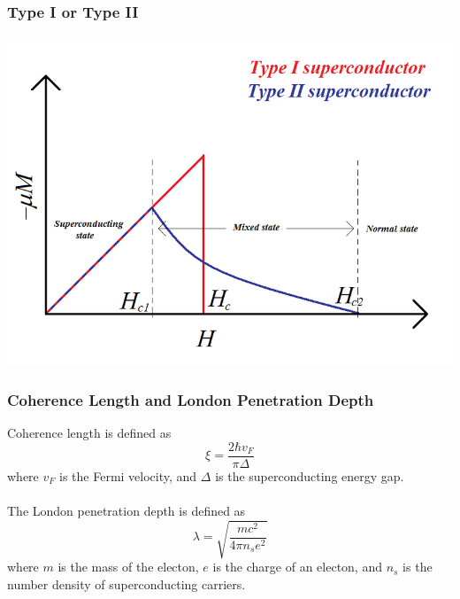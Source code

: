 \documentclass[10pt]{beamer}
\theoremstyle{definition}
\begin{document}
\begin{frame}
    \frametitle{Type I or Type II}

    \begin{center}
    \includegraphics[scale = 0.3]{Magnetisation_and_superconductors}
    \end{center}

\end{frame}


\begin{frame}
    \frametitle{Coherence Length and London Penetration Depth}

    Coherence length is defined as
    \begin{equation}
        \xi = \frac{2 \hbar v_F}{\pi \Delta}
    \end{equation}
    where $v_F$ is the Fermi velocity, and $\Delta$ is the superconducting
    energy gap.
    \\~\\

    The London penetration depth is defined as
    \begin{equation}
        \lambda = \sqrt{\frac{mc^2}{4\pi n_s e^2}}
    \end{equation}
    where $m$ is the mass of the electon, $e$ is the charge of an electon, and
    $n_s$ is the number density of superconducting carriers.

\end{frame}
\end{document}
